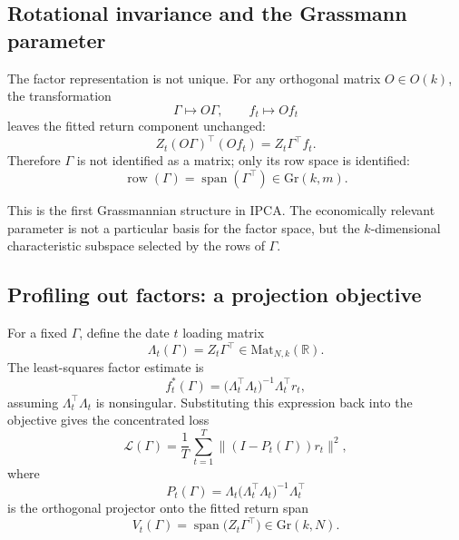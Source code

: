 \documentclass[11pt,letterpaper]{article}
\newcommand{\gr}{\mathrm{Gr}}
\newcommand{\bR}{\mathbb{R}}
\newcommand{\cL}{\mathcal{L}}
\begin{document}
\subsection{Rotational invariance and the Grassmann parameter}
\label{sec:ipca:grassmann}

The factor representation is not unique. For any orthogonal matrix $O\in O(k)$, the transformation
\begin{equation*}
\Gamma \mapsto O\Gamma, \qquad f_t \mapsto Of_t
\end{equation*}
leaves the fitted return component unchanged:
\begin{equation*}
Z_t (O\Gamma)^\top (Of_t)=Z_t\Gamma^\top f_t.
\end{equation*}
Therefore $\Gamma$ is not identified as a matrix; only its row space is identified:
\begin{equation*}
\operatorname{row}(\Gamma) = \operatorname{span}(\Gamma^\top)
\in \gr(k,m).
\end{equation*}

This is the first Grassmannian structure in IPCA. The economically relevant parameter is not a particular basis for the factor space, but the $k$-dimensional characteristic subspace selected by the rows of $\Gamma$.

\subsection{Profiling out factors: a projection objective}
\label{sec:ipca:projection}

For a fixed $\Gamma$, define the date $t$ loading matrix
\begin{equation*}
\Lambda_t(\Gamma)=Z_t\Gamma^\top\in \mathrm{Mat}_{N,k}(\bR).
\end{equation*}
The least-squares factor estimate is
\begin{equation*}
f_t^*(\Gamma)=\bigl(\Lambda_t^\top\Lambda_t\bigr)^{-1}\Lambda_t^\top r_t,
\end{equation*}
assuming $\Lambda_t^\top\Lambda_t$ is nonsingular. Substituting this expression back into the objective gives the concentrated loss
\begin{equation*}
\cL(\Gamma)=\frac{1}{T}\,\sum_{t=1}^T \|(I-P_t(\Gamma))r_t\|^2,
\end{equation*}
where
\begin{equation*}
P_t(\Gamma)=\Lambda_t\bigl(\Lambda_t^\top\Lambda_t\bigr)^{-1}\Lambda_t^\top
\end{equation*}
is the orthogonal projector onto the fitted return span
\begin{equation*}
V_t(\Gamma) = \operatorname{span}\bigl(Z_t\Gamma^\top\bigr)
\in \gr(k,N).
\end{equation*}
\end{document}
